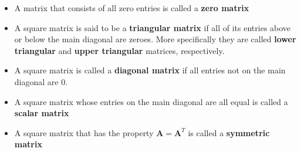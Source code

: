 \documentclass{article}
\begin{document}
\begin{itemize}
  \item A matrix that consists of all zero entries is called a \textbf{zero matrix}

  \item A square matrix is said to be a \textbf{triangular matrix} if all of its entries above or below the main diagonal are zeroes. More specifically they are called \textbf{lower triangular} and \textbf{upper triangular} matrices, respectively.

  \item A square matrix is called a \textbf{diagonal matrix} if all entries not on the main diagonal are 0.

  \item A square matrix whose entries on the main diagonal are all equal is called a \textbf{scalar matrix}

  \item A square matrix that has the property $\mathbf{A} = \mathbf{A}^T$ is called a \textbf{symmetric matrix}
\end{itemize}
\end{document}
